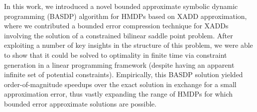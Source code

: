 
In this work, we introduced a novel bounded approximate symbolic
dynamic programming (BASDP) algorithm for HMDPs based on XADD
approximation, where we contributed a bounded error compression technique
for XADDs involving the solution of a constrained bilinear saddle
point problem.  After exploiting a number of key insights in the
structure of this problem, we were able to show that it could be solved
to optimality in finite time via constraint generation in a linear
programming framework (despite having an apparent infinite set of
potential constraints).  Empirically, this BASDP solution yielded
order-of-magnitude speedups over the exact solution in exchange for a
small approximation error, thus vastly expanding the range of HMDPs
for which bounded error approximate solutions are possible.
